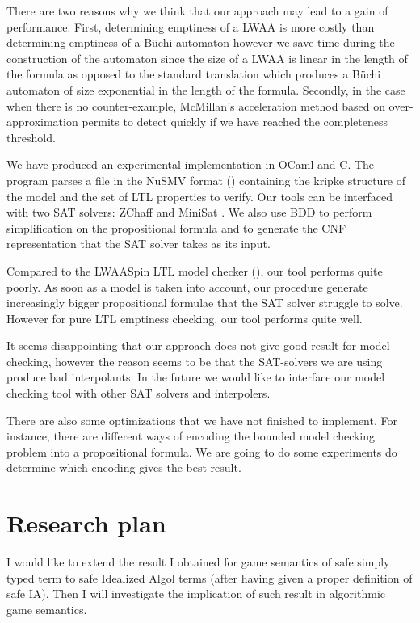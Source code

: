 There are two reasons why we think that our approach may lead to a
gain of performance. First, determining emptiness of a LWAA is more
costly than determining emptiness of a B\"uchi automaton however we
save time during the construction of the automaton since the size of
a LWAA is linear in the length of the formula as opposed to the
standard translation which produces a B\"uchi automaton of size
exponential in the length of the formula. Secondly, in the case when
there is no counter-example, McMillan's acceleration method based on
over-approximation permits to detect quickly if we have reached the
completeness threshold.


We have produced an experimental implementation in OCaml and C. The
program parses a file in the NuSMV format (\cite{CAV02:nusmv})
containing the kripke structure of the model and the set of LTL
properties to verify. Our tools can be interfaced with two SAT
solvers: ZChaff \citep{zChaff} and MiniSat \citep{ES03}. We also use
BDD to perform simplification on the propositional formula and to
generate the CNF representation that the SAT solver takes as its
input.

Compared to the LWAASpin LTL model checker (\cite{hammer:truly}),
our tool performs quite poorly. As soon as a model is taken into
account, our procedure generate increasingly bigger propositional
formulae that the SAT solver struggle to solve. However for pure LTL
emptiness checking, our tool performs quite well.

It seems disappointing that our approach does not give good result
for model checking, however the reason seems to be that the
SAT-solvers we are using produce bad interpolants. In the future we
would like to interface our model checking tool with other SAT
solvers and interpolers.

There are also some optimizations that we have not finished to
implement. For instance, there are different ways of encoding the
bounded model checking problem into a propositional formula. We are
going to do some experiments do determine which encoding gives the
best result.

\chapter{Research plan}

I would like to extend the result I obtained for game semantics of
safe simply typed term to safe Idealized Algol terms (after having
given a proper definition of safe IA). Then I will investigate the
implication of such result in algorithmic game semantics.

